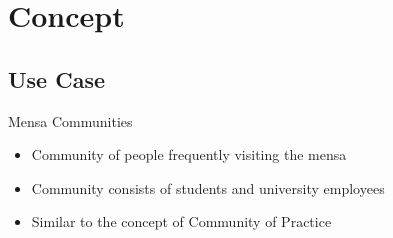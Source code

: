 



\section{Concept}
\subsection{Use Case}
\begin{frame}{Mensa Communities}
  \begin{itemize}
    \item Community of people frequently visiting the mensa
    \item Community consists of students and university employees
    \item Similar to the concept of Community of Practice %
  \end{itemize}
\end{frame}



